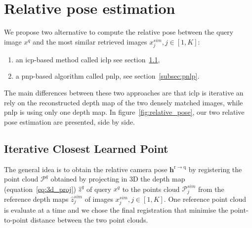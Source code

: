 \section{Relative pose estimation}


\label{sec:relative_pose}
We propose two alternative to compute the relative pose between the query image $x^q$ and the most similar retrieved images $x^{sim}_j, j \in [1, K]$:
\begin{enumerate}
	\item an \ac{icp}-based method called \ac{iclp} see section~\ref{subsec:pc_alignment},
	\item a \ac{pnp}-based algorithm called \ac{pnlp}, see section~\ref{subsec:pnlp}.
\end{enumerate}
\noindent The main differences between these two approaches are that \ac{iclp} is iterative an rely on the reconstructed depth map of the two densely matched images, while \ac{pnlp} is using only one depth map. In figure~\ref{fig:relative_pose}, our two relative pose estimation are presented, side by side.

\subsection{Iterative Closest Learned Point}
\label{subsec:pc_alignment}
The general idea is to obtain the relative camera pose $\mathbf{h}^\mathrm{r \rightarrow q}$ by registering the point cloud $\mathcal{P}^q$ obtained by projecting in 3D the depth map (equation~\ref{eq:3d_proj}) $\hat{z}^q$ of query $x^q$ to the points cloud $\mathcal{P}^{sim}_j$ from the reference depth maps $\hat{z}^{sim}_j$ of images $x^{sim}_j, j \in [1, K]$. One reference point cloud is evaluate at a time and we chose the final registration that minimise the point-to-point distance between the two point clouds.


